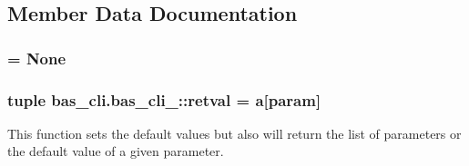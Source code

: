 \subsection{\-Member \-Data \-Documentation}
\hypertarget{classbas__cli_1_1bas__cli___a44930beb6e368a3d6adddbdf8a05bca6}{
\subsubsection[{i\-\_\-am\-\_\-a\-\_\-casapy\-\_\-task}]{ = \-None}}\label{classbas__cli_1_1bas__cli___a44930beb6e368a3d6adddbdf8a05bca6}
\hypertarget{classbas__cli_1_1bas__cli___a1961628515a0b77eb27e93c853d64a8f}{
\subsubsection[{parameters}]{}}\label{classbas__cli_1_1bas__cli___a1961628515a0b77eb27e93c853d64a8f}
\hypertarget{classbas__cli_1_1bas__cli___a577368c0e03daf25c31ee1180a622ad2}{
\subsubsection[{retval}]{\setlength{\rightskip}{0pt plus 5cm}tuple {\bf bas\-\_\-cli.\-bas\-\_\-cli\-\_\-\-::retval} = a\mbox{[}param\mbox{]}}}\label{classbas__cli_1_1bas__cli___a577368c0e03daf25c31ee1180a622ad2}


\-This function sets the default values but also will return the list of parameters or the default value of a given parameter. 


